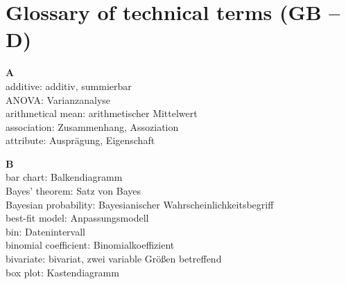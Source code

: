 \chapter[Glossary of technical terms (GB -- D)]{Glossary of 
technical terms (GB -- D)}

\noindent
{\bf A}\\
additive: additiv, summierbar\\
ANOVA: Varianzanalyse\\
arithmetical mean: arithmetischer Mittelwert\\
association: Zusammenhang, Assoziation\\
attribute: Auspr\"{a}gung, Eigenschaft

\medskip
\noindent
{\bf B}\\
bar chart: Balkendiagramm\\
Bayes' theorem: Satz von Bayes\\
Bayesian probability: Bayesianischer Wahrscheinlichkeitsbegriff\\
best-fit model: Anpassungsmodell\\
bin: Datenintervall\\
binomial coefficient: Binomialkoeffizient\\
bivariate: bivariat, zwei variable Gr\"{o}\ss en betreffend\\
box plot: Kastendiagramm

